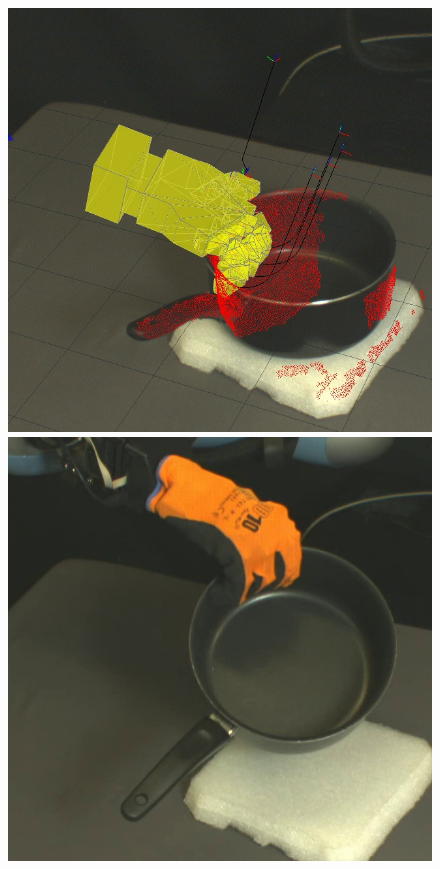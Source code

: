 \begin{figure}
\begin{center}
  \includegraphics[width=\tw]{images/experiments/query/saucepanlarge-1-s} \hspace{-6pt}
 \includegraphics[width=\tw]{images/experiments/exec/saucepanlarge-s}

\end{center}
\end{figure}
